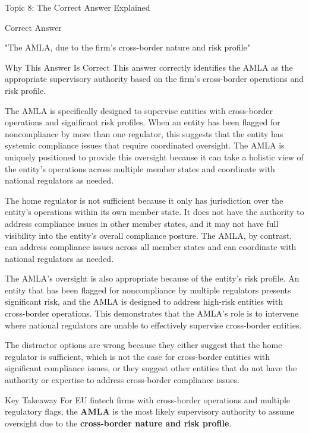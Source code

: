 \documentclass[8pt]{beamer}  %
\newcommand{\correct}{\textcolor{correctgreen}{\ding{51}}}
\begin{document}
	\begin{frame}{Topic 8: The Correct Answer Explained}
		\begin{block}{\large \correct \textcolor{correctgreen}{Correct Answer}}
			\begin{center}
				\Large "The AMLA, due to the firm's cross-border nature and risk profile"
			\end{center}
		\end{block}
		
		\vspace{0.2cm}
		\begin{block}{\large Why This Answer Is Correct}
			This answer correctly identifies the AMLA as the appropriate supervisory authority based on the firm's cross-border operations and risk profile.
			
			The AMLA is specifically designed to supervise entities with cross-border operations and significant risk profiles. When an entity has been flagged for noncompliance by more than one regulator, this suggests that the entity has systemic compliance issues that require coordinated oversight. The AMLA is uniquely positioned to provide this oversight because it can take a holistic view of the entity's operations across multiple member states and coordinate with national regulators as needed.
			
			The home regulator is not sufficient because it only has jurisdiction over the entity's operations within its own member state. It does not have the authority to address compliance issues in other member states, and it may not have full visibility into the entity's overall compliance posture. The AMLA, by contrast, can address compliance issues across all member states and can coordinate with national regulators as needed.
			
			The AMLA's oversight is also appropriate because of the entity's risk profile. An entity that has been flagged for noncompliance by multiple regulators presents significant risk, and the AMLA is designed to address high-risk entities with cross-border operations. This demonstrates that the AMLA's role is to intervene where national regulators are unable to effectively supervise cross-border entities.
			
			The distractor options are wrong because they either suggest that the home regulator is sufficient, which is not the case for cross-border entities with significant compliance issues, or they suggest other entities that do not have the authority or expertise to address cross-border compliance issues.
		\end{block}
		
		\begin{alertblock}{Key Takeaway}
			For EU fintech firms with cross-border operations and multiple regulatory flags, the \textbf{AMLA} is the most likely supervisory authority to assume oversight due to the \textbf{cross-border nature and risk profile}.
		\end{alertblock}
	\end{frame}
	
\end{document}
